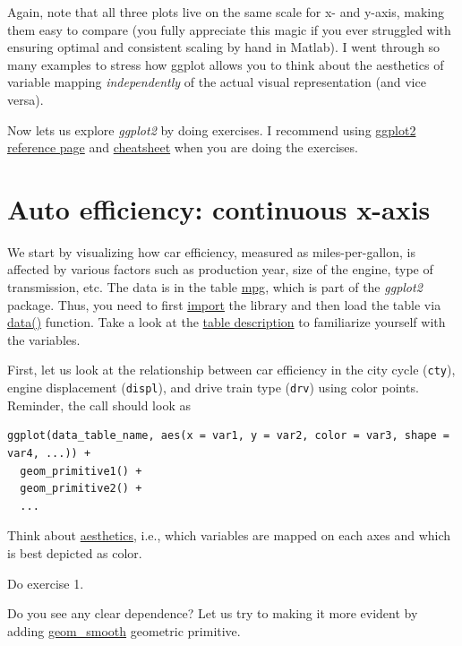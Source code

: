 \documentclass[
]{book}
\begin{document}
Again, note that all three plots live on the same scale for x- and y-axis, making them easy to compare (you fully appreciate this magic if you ever struggled with ensuring optimal and consistent scaling by hand in Matlab). I went through so many examples to stress how ggplot allows you to think about the aesthetics of variable mapping \emph{independently} of the actual visual representation (and vice versa).

Now lets us explore \emph{ggplot2} by doing exercises. I recommend using \href{https://ggplot2.tidyverse.org/}{ggplot2 reference page} and \href{https://github.com/rstudio/cheatsheets/raw/master/data-visualization-2.1.pdf}{cheatsheet} when you are doing the exercises.

\hypertarget{auto-efficiency-continuous-x-axis}{%
\section{Auto efficiency: continuous x-axis}\label{auto-efficiency-continuous-x-axis}}

We start by visualizing how car efficiency, measured as miles-per-gallon, is affected by various factors such as production year, size of the engine, type of transmission, etc. The data is in the table \href{https://ggplot2.tidyverse.org/reference/mpg.html}{mpg}, which is part of the \emph{ggplot2} package. Thus, you need to first \protect\hyperlink{library}{import} the library and then load the table via \protect\hyperlink{data}{data()} function. Take a look at the \href{https://ggplot2.tidyverse.org/reference/mpg.html}{table description} to familiarize yourself with the variables.

First, let us look at the relationship between car efficiency in the city cycle (\texttt{cty}), engine displacement (\texttt{displ}), and drive train type (\texttt{drv}) using color points. Reminder, the call should look as

\begin{verbatim}
ggplot(data_table_name, aes(x = var1, y = var2, color = var3, shape = var4, ...)) + 
  geom_primitive1() + 
  geom_primitive2() +
  ...
\end{verbatim}

Think about \href{https://ggplot2.tidyverse.org/reference/aes.html}{aesthetics}, i.e., which variables are mapped on each axes and which is best depicted as color.

Do exercise 1.

Do you see any clear dependence? Let us try to making it more evident by adding \href{https://ggplot2.tidyverse.org/reference/geom_smooth.html}{geom\_smooth} geometric primitive.
\end{document}
